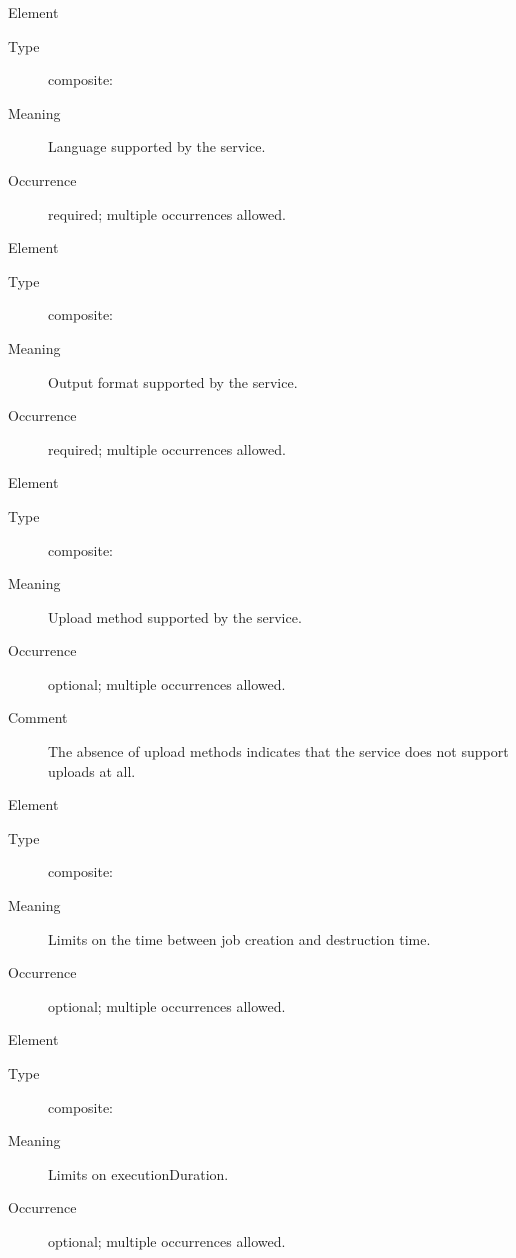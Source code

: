 \documentclass{ivoa}
\begin{document}
\begin{generated}
\begin{bigdescription}
\begin{description}
\end{description}
\item[Element \xmlel{language}]
\begin{description}
\item[Type] composite: 
\item[Meaning] Language supported by the service.
\item[Occurrence] required; multiple occurrences allowed.

\end{description}
\item[Element \xmlel{outputFormat}]
\begin{description}
\item[Type] composite: 
\item[Meaning] Output format supported by the service.
\item[Occurrence] required; multiple occurrences allowed.

\end{description}
\item[Element \xmlel{uploadMethod}]
\begin{description}
\item[Type] composite: 
\item[Meaning] Upload method supported by the service.
\item[Occurrence] optional; multiple occurrences allowed.
\item[Comment] The absence of upload methods indicates
                that the service does not support uploads
                at all.

\end{description}
\item[Element \xmlel{retentionPeriod}]
\begin{description}
\item[Type] composite: 
\item[Meaning] Limits on the time between job creation and
              destruction time.
\item[Occurrence] optional; multiple occurrences allowed.

\end{description}
\item[Element \xmlel{executionDuration}]
\begin{description}
\item[Type] composite: 
\item[Meaning] Limits on executionDuration.
\item[Occurrence] optional; multiple occurrences allowed.


\end{description}
\end{bigdescription}
\end{generated}
\end{document}
